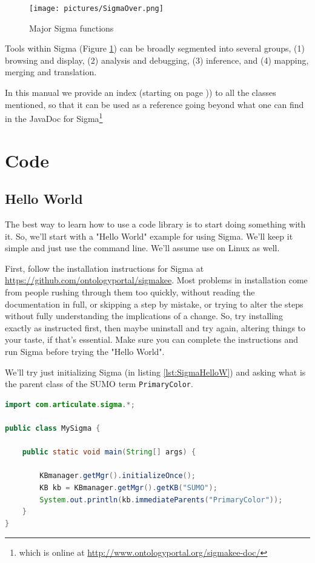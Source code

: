 \documentclass{book}
\begin{document}
\begin{figure}
  \centering
  \texttt{[image: pictures/SigmaOver.png]}
  \caption{Major Sigma functions}
  \label{fig:SigmaOver}
\end{figure}

Tools within Sigma (Figure \ref{fig:SigmaOver}) can be broadly segmented into
several groups, (1) browsing and display, (2) analysis and debugging, (3)
inference, and (4) mapping, merging and translation.

In this manual we provide an index (starting on page \pageref{classindex})) to
all the classes mentioned, so that it can be used as a reference going beyond
what one can find in the JavaDoc for Sigma\footnote{which is online at
\url{http://www.ontologyportal.org/sigmakee-doc/}}

\chapter{Code}

\section{Hello World}

The best way to learn how to use a code library is to start doing something with it. So,
we'll start with a "Hello World" example for using Sigma.  We'll keep it simple and just
use the command line.  We'll assume use on Linux as well.

First, follow the installation instructions for Sigma at
\url{https://github.com/ontologyportal/sigmakee}. Most problems in installation
come from people rushing through them too quickly, without reading the
documentation in full, or skipping a step by mistake, or trying to alter the
steps without fully understanding the implications of a change.  So, try
installing exactly as instructed first, then maybe uninstall and try again,
altering things to your taste, if that's essential.  Make sure you can complete the
instructions and run Sigma before trying the "Hello World".

We'll try just initializing Sigma (in listing \ref{lst:SigmaHelloW}) and asking what is the parent class of the
SUMO term \texttt{PrimaryColor}.

\begin{lstlisting}[language=java, basicstyle=\ttfamily\small\bfseries, caption=
Simplest Java call to Sigma", label=lst:SigmaHelloW]
import com.articulate.sigma.*;

public class MySigma {

    public static void main(String[] args) {

        KBmanager.getMgr().initializeOnce();
        KB kb = KBmanager.getMgr().getKB("SUMO");
        System.out.println(kb.immediateParents("PrimaryColor"));
    }
}
\end{lstlisting}
\end{document}
